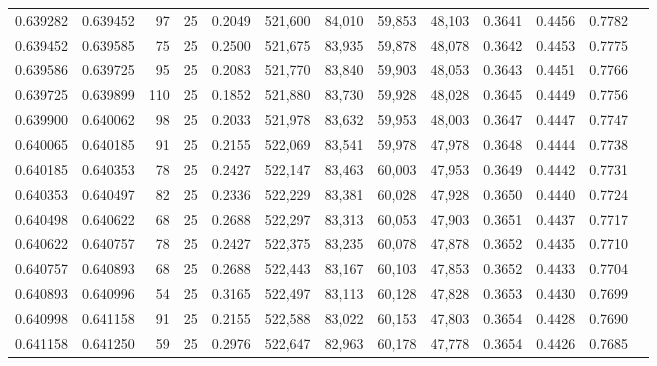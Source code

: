 \begin{tabular}{rrrrrrrrrrrrr}
0.639282 & 0.639452 &    97 &  25 &                                     0.2049 & 521,600 &  84,010 &  59,853 &  48,103 & 0.3641 & 0.4456 & 0.7782 \\
0.639452 & 0.639585 &    75 &  25 &                                     0.2500 & 521,675 &  83,935 &  59,878 &  48,078 & 0.3642 & 0.4453 & 0.7775 \\
0.639586 & 0.639725 &    95 &  25 &                                     0.2083 & 521,770 &  83,840 &  59,903 &  48,053 & 0.3643 & 0.4451 & 0.7766 \\
0.639725 & 0.639899 &   110 &  25 &                                     0.1852 & 521,880 &  83,730 &  59,928 &  48,028 & 0.3645 & 0.4449 & 0.7756 \\
0.639900 & 0.640062 &    98 &  25 &                                     0.2033 & 521,978 &  83,632 &  59,953 &  48,003 & 0.3647 & 0.4447 & 0.7747 \\
0.640065 & 0.640185 &    91 &  25 &                                     0.2155 & 522,069 &  83,541 &  59,978 &  47,978 & 0.3648 & 0.4444 & 0.7738 \\
0.640185 & 0.640353 &    78 &  25 &                                     0.2427 & 522,147 &  83,463 &  60,003 &  47,953 & 0.3649 & 0.4442 & 0.7731 \\
0.640353 & 0.640497 &    82 &  25 &                                     0.2336 & 522,229 &  83,381 &  60,028 &  47,928 & 0.3650 & 0.4440 & 0.7724 \\
0.640498 & 0.640622 &    68 &  25 &                                     0.2688 & 522,297 &  83,313 &  60,053 &  47,903 & 0.3651 & 0.4437 & 0.7717 \\
0.640622 & 0.640757 &    78 &  25 &                                     0.2427 & 522,375 &  83,235 &  60,078 &  47,878 & 0.3652 & 0.4435 & 0.7710 \\
0.640757 & 0.640893 &    68 &  25 &                                     0.2688 & 522,443 &  83,167 &  60,103 &  47,853 & 0.3652 & 0.4433 & 0.7704 \\
0.640893 & 0.640996 &    54 &  25 &                                     0.3165 & 522,497 &  83,113 &  60,128 &  47,828 & 0.3653 & 0.4430 & 0.7699 \\
0.640998 & 0.641158 &    91 &  25 &                                     0.2155 & 522,588 &  83,022 &  60,153 &  47,803 & 0.3654 & 0.4428 & 0.7690 \\
0.641158 & 0.641250 &    59 &  25 &                                     0.2976 & 522,647 &  82,963 &  60,178 &  47,778 & 0.3654 & 0.4426 & 0.7685 \\

\end{tabular}
